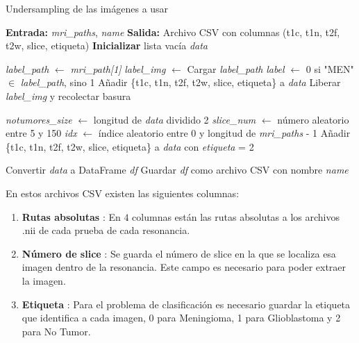 \begin{algorithm}
	\caption{Undersampling de las imágenes a usar}
	\begin{algorithmic}[1]
		\STATE \textbf{Entrada:} \textit{mri\_paths}, \textit{name}
		\STATE \textbf{Salida:} Archivo CSV con columnas (t1c, t1n, t2f, t2w, slice, etiqueta)
		\STATE \textbf{Inicializar} lista vacía \textit{data}
		
		\STATE \textit{label\_path} $\gets$ \textit{mri\_path[1]}
		\STATE \textit{label\_img} $\gets$ Cargar \textit{label\_path}
		\STATE \textit{label} $\gets$ 0 si "MEN" $\in$ \textit{label\_path}, sino 1
		\STATE Añadir \{t1c, t1n, t2f, t2w, slice, etiqueta\} a \textit{data}
		\ENDIF
		\ENDFOR
		\STATE Liberar \textit{label\_img} y recolectar basura
		\ENDFOR
		
		\STATE \textit{notumores\_size} $\gets$ longitud de \textit{data} dividido 2
		\STATE \textit{slice\_num} $\gets$ número aleatorio entre 5 y 150
		\STATE \textit{idx} $\gets$ índice aleatorio entre 0 y longitud de \textit{mri\_paths} - 1
		\STATE Añadir \{t1c, t1n, t2f, t2w, slice, etiqueta\} a \textit{data} con \textit{etiqueta} = 2
		\ENDIF
		\ENDFOR
		
		\STATE Convertir \textit{data} a DataFrame \textit{df}
		\STATE Guardar \textit{df} como archivo CSV con nombre \textit{name}
		
	\end{algorithmic}
\end{algorithm}


En estos archivos CSV existen las siguientes columnas:

\begin{enumerate}
	\item \textbf{Rutas absolutas} : En $4$ columnas están las rutas absolutas a los archivos .nii de cada prueba de cada resonancia.
	\item \textbf{Número de slice} : Se guarda el número de slice en la que se localiza esa imagen dentro de la resonancia. Este campo es necesario para poder extraer la imagen.
	\item \textbf{Etiqueta} : Para el problema de clasificación es necesario guardar la etiqueta que identifica a cada imagen, 0 para Meningioma, 1 para Glioblastoma y 2 para No Tumor.
\end{enumerate}

